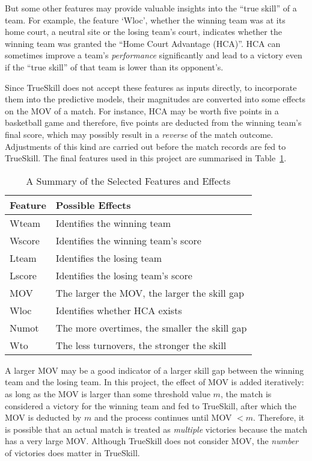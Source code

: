 But some other features may provide valuable insights into the ``true skill'' of a team. For example, the feature `Wloc', whether the winning team was at its home court, a neutral site or the losing team's court, indicates whether the winning team was granted the ``Home Court Advantage (HCA)''. HCA can sometimes improve a team's \emph{performance} significantly and lead to a victory even if the ``true skill'' of that team is lower than its opponent's. 

Since TrueSkill does not accept these features as inputs directly, to incorporate them into the predictive models, their magnitudes are converted into some effects on the MOV of a match. For instance, HCA may be worth five points in a basketball game and therefore, five points are deducted from the winning team's final score, which may possibly result in a \emph{reverse} of the match outcome. Adjustments of this kind are carried out before the match records are fed to TrueSkill. The final features used in this project are summarised in Table~\ref{Ta:sele_feature}. 

\begin{table}[h!]
\centering
\begin{tabular}{ | l | l | }
\hline
\textbf{Feature} & \textbf{Possible Effects} \\ \hline
Wteam & Identifies the winning team \\ \hline
Wscore & Identifies the winning team's score \\ \hline
Lteam &  Identifies the losing team \\ \hline
Lscore & Identifies the losing team's score \\ \hline
MOV & The larger the MOV, the larger the skill gap \\\hline 
Wloc & Identifies whether HCA exists \\ \hline
Numot & The more overtimes, the smaller the skill gap \\ \hline
Wto & The less turnovers, the stronger the skill \\ \hline
\end{tabular}
\caption{A Summary of the Selected Features and Effects}\label{Ta:sele_feature}
\end{table}

A larger MOV may be a good indicator of a larger skill gap between the winning team and the losing team. In this project, the effect of MOV is added iteratively: as long as the MOV is larger than some threshold value $m$, the match is considered a victory for the winning team and fed to TrueSkill, after which the MOV is deducted by $m$ and the process continues until MOV $<m$. Therefore, it is possible that an actual match is treated as \emph{multiple} victories because the match has a very large MOV. Although TrueSkill does not consider MOV, the \emph{number} of victories does matter in TrueSkill. 

